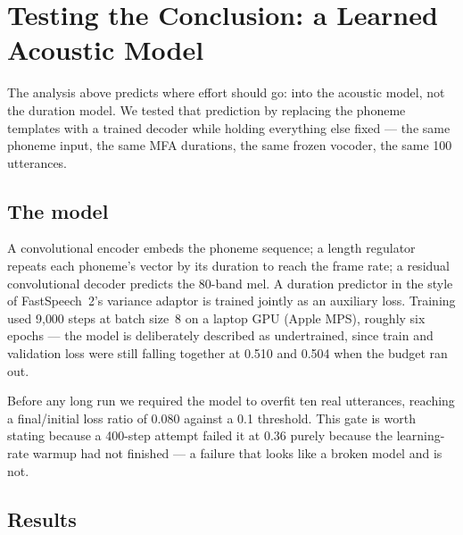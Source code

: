 \documentclass[conference]{IEEEtran}
\begin{document}
\section{Testing the Conclusion: a Learned Acoustic Model}
\label{sec:phase2}

The analysis above predicts where effort should go: into the acoustic model, not the duration
model. We tested that prediction by replacing the phoneme templates with a trained decoder while
holding everything else fixed --- the same phoneme input, the same MFA durations, the same frozen
vocoder, the same 100 utterances.

\subsection{The model}
A convolutional encoder embeds the phoneme sequence; a length regulator repeats each phoneme's
vector by its duration to reach the frame rate; a residual convolutional decoder predicts the
80-band mel. A duration predictor in the style of FastSpeech~2's variance adaptor is trained
jointly as an auxiliary loss. Training used 9{,}000 steps at batch size~8 on a laptop GPU
(Apple MPS), roughly six epochs --- the model is deliberately described as undertrained, since
train and validation loss were still falling together at 0.510 and 0.504 when the budget ran out.

Before any long run we required the model to overfit ten real utterances, reaching a final/initial
loss ratio of 0.080 against a 0.1 threshold. This gate is worth stating because a 400-step attempt
failed it at 0.36 purely because the learning-rate warmup had not finished --- a failure that
looks like a broken model and is not.

\subsection{Results}
\end{document}
